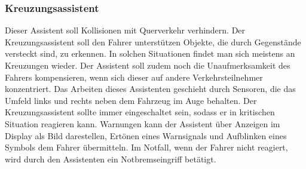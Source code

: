         \subsubsection{Kreuzungsassistent}
        Dieser Assistent soll Kollisionen mit Querverkehr verhindern. Der Kreuzungsassistent soll den Fahrer 
        unterstützen Objekte, die durch Gegenstände versteckt sind, zu erkennen. In solchen Situationen findet 
        man sich meistens an Kreuzungen wieder. Der Assistent soll zudem noch die Unaufmerksamkeit des 
        Fahrers kompensieren, wenn sich dieser auf andere Verkehrsteilnehmer konzentriert. Das Arbeiten  
        dieses Assistenten geschieht durch Sensoren, die das Umfeld links und rechts neben dem Fahrzeug im 
        Auge behalten. Der Kreuzungsassistent sollte immer eingeschaltet sein, sodass er in kritischen Situation 
        reagieren kann. Warnungen kann der Assistent über Anzeigen im Display als Bild darestellen, Ertönen eines Warnsignals
        und Aufblinken eines Symbols dem Fahrer übermitteln. Im Notfall, wenn der Fahrer nicht 
        reagiert, wird durch den Assistenten ein Notbremseingriff betätigt.
        ~\cite{kreuzungsassi.PB1} ~\cite{kreuzungsassi.PB2}
